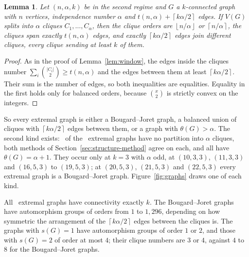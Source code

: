 \documentclass[11pt]{article}
\newtheorem{lemma}[theorem]{Lemma}
\theoremstyle{definition}
\theoremstyle{remark}
\newcommand{\ceil}[1]{\left\lceil #1\right\rceil}
\newcommand{\floor}[1]{\left\lfloor #1\right\rfloor}
\begin{document}
\begin{lemma}\label{lem:partition-structure}
Let $(n,\alpha,k)$ be in the second regime and $G$ a $k$-connected graph with $n$ vertices, independence number
$\alpha$ and $t(n,\alpha)+\ceil{k\alpha/2}$ edges. If $V(G)$ splits into $\alpha$ cliques $C_1,\dots,C_\alpha$, then
the clique orders are $\floor{n/\alpha}$ or $\ceil{n/\alpha}$, the cliques span exactly $t(n,\alpha)$ edges, and
exactly $\ceil{k\alpha/2}$ edges join different cliques, every clique sending at least $k$ of them.
\end{lemma}

\begin{proof}
As in the proof of Lemma~\ref{lem:window}, the edges inside the cliques number $\sum_i\binom{|C_i|}{2}\ge t(n,\alpha)$
and the edges between them at least $\ceil{k\alpha/2}$. Their sum is the number of edges, so both inequalities are
equalities. Equality in the first holds only for balanced orders, because $\binom{x}{2}$ is strictly convex on the
integers.
\end{proof}

So every extremal graph is either a Bougard--Joret graph, a balanced union of cliques with $\ceil{k\alpha/2}$ edges
between them, or a graph with $\theta(G)>\alpha$. The second kind exists: \nnopart\ of the \nextremal\ extremal graphs
have no partition into $\alpha$ cliques, both methods of Section~\ref{sec:structure-method} agree on each, and all have
$\theta(G)=\alpha+1$. They occur only at $k=3$ with $\alpha$ odd, at $(10,3,3)$, $(11,3,3)$ and $(16,5,3)$ to
$(19,5,3)$; at $(20,5,3)$, $(21,5,3)$ and $(22,5,3)$ every extremal graph is a Bougard--Joret graph. Figure~\ref{fig:graphs}
draws one of each kind.

All \nextremal\ extremal graphs have connectivity exactly $k$. The Bougard--Joret graphs have automorphism groups of
orders from $1$ to $1{,}296$, depending on how symmetric the arrangement of the $\ceil{k\alpha/2}$ edges between the
cliques is. The graphs with $s(G)=1$ have automorphism groups of order $1$ or $2$, and those with $s(G)=2$ of order at
most $4$; their clique numbers are $3$ or $4$, against $4$ to $8$ for the Bougard--Joret graphs.

\begin{table}[p]
\centering\small
\caption{The extremal graphs at the conjectured value. Graphs: all extremal graphs (each rechecked independently).
Partition: those with a partition into $\alpha$ cliques, all of Bougard--Joret structure. $s$: the distribution of
Didin's parameter $s(G)=\alpha-p(G)$. Allowed: the values of $s$ that Proposition~\ref{prop:where} permits.}
\label{tab:structure}

\end{table}
\end{document}
